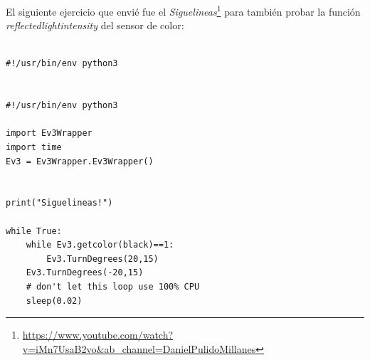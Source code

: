 El siguiente ejercicio que envié fue el \textit{Siguelineas}\footnote{\url{https://www.youtube.com/watch?v=iMn7UsaB2vo&ab_channel=DanielPulidoMillanes}} para también probar la función \textit{reflectedlightintensity} del sensor de color:
 
 \begin{lstlisting}[frame=single,breaklines=true, label=Siguelineas, caption=SigueLineas,  captionpos=b]

#!/usr/bin/env python3


#!/usr/bin/env python3

import Ev3Wrapper
import time
Ev3 = Ev3Wrapper.Ev3Wrapper()


print("Siguelineas!")

while True:
    while Ev3.getcolor(black)==1:
        Ev3.TurnDegrees(20,15)
    Ev3.TurnDegrees(-20,15)
    # don't let this loop use 100% CPU
    sleep(0.02)

\end{lstlisting}


